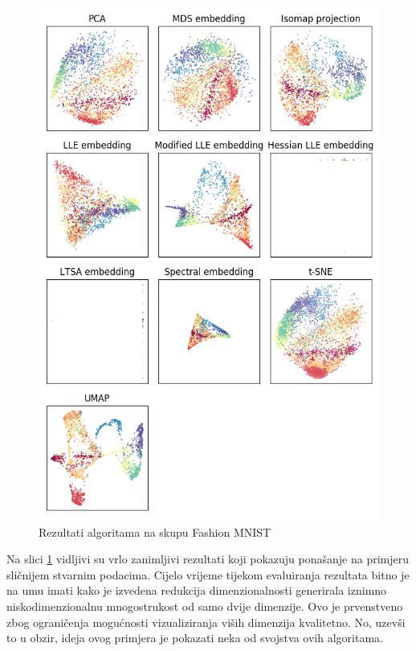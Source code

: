 \documentclass[times, utf8, diplomski]{fer}
\begin{document}
\begin{figure}[htb]
    \centering
    \includegraphics[width=\textwidth]{resources/images/reduction/compare/xfmnist.png}
    \caption{Rezultati algoritama na skupu Fashion MNIST}
    \label{fig:xfmnist}
\end{figure}

Na slici \ref{fig:xfmnist} vidljivi su vrlo zanimljivi rezultati koji pokazuju ponašanje na primjeru sličnijem stvarnim podacima. Cijelo vrijeme tijekom evaluiranja rezultata bitno je na umu imati kako je izvedena redukcija dimenzionalnosti generirala iznimno niskodimenzionalnu mnogostrukost od samo dvije dimenzije. Ovo je prvenstveno zbog ograničenja mogućnosti vizualiziranja viših dimenzija kvalitetno. No, uzevši to u obzir, ideja ovog primjera je pokazati neka od svojstva ovih algoritama.
\end{document}
